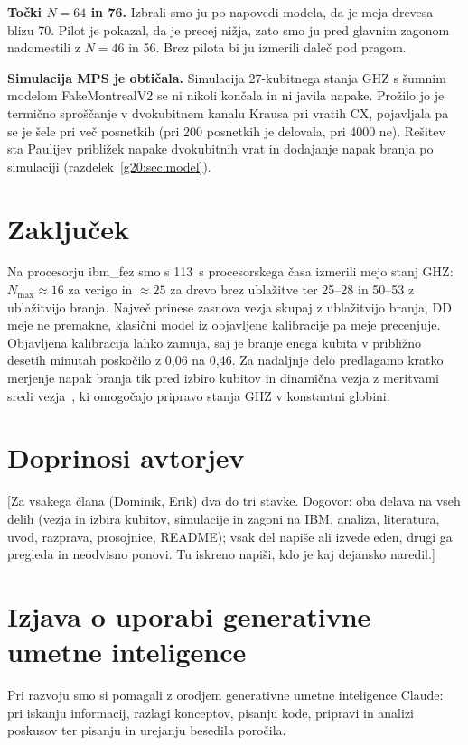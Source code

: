 \textbf{Točki $N=64$ in 76.} Izbrali smo ju po napovedi modela, da je meja drevesa blizu 70. Pilot je pokazal, da je precej nižja, zato smo ju
pred glavnim zagonom nadomestili z $N=46$ in 56. Brez pilota bi ju izmerili daleč pod pragom.

\textbf{Simulacija MPS je obtičala.} Simulacija 27-kubitnega stanja GHZ s šumnim modelom FakeMontrealV2 se ni nikoli končala
in ni javila napake. Prožilo jo je termično sproščanje v dvokubitnem kanalu Krausa pri vratih CX, pojavljala pa se je šele pri
več posnetkih (pri 200 posnetkih je delovala, pri 4000 ne). Rešitev sta Paulijev približek napake dvokubitnih vrat in
dodajanje napak branja po simulaciji (razdelek~\ref{g20:sec:model}).



\section{Zaključek}
\label{g20:sec:zakljucek}

Na procesorju ibm\_fez smo s 113~s procesorskega časa izmerili mejo stanj GHZ: $N_{\max}\approx16$ za verigo in $\approx25$ za drevo brez
ublažitve ter 25--28 in 50--53 z ublažitvijo branja. Največ prinese zasnova vezja skupaj z ublažitvijo branja, DD meje ne premakne,
klasični model iz objavljene kalibracije pa meje precenjuje. Objavljena kalibracija lahko zamuja, saj je branje enega kubita v približno desetih minutah
poskočilo z 0,06 na 0,46. Za nadaljnje delo predlagamo kratko merjenje napak branja tik pred izbiro kubitov in dinamična vezja z meritvami
sredi vezja~\cite{g20:baumer2024}, ki omogočajo pripravo stanja GHZ v konstantni globini.


\section*{Doprinosi avtorjev}

[Za vsakega člana (Dominik, Erik) dva do tri stavke. Dogovor: oba delava na vseh delih (vezja in izbira kubitov, simulacije
in zagoni na IBM, analiza, literatura, uvod, razprava, prosojnice, README); vsak del napiše ali izvede eden, drugi ga pregleda
in neodvisno ponovi. Tu iskreno napiši, kdo je kaj dejansko naredil.]

\section*{Izjava o uporabi generativne umetne inteligence}

Pri razvoju smo si pomagali z orodjem generativne umetne inteligence Claude: pri iskanju informacij, razlagi konceptov, pisanju kode, %
pripravi in analizi poskusov ter pisanju in urejanju besedila poročila.
